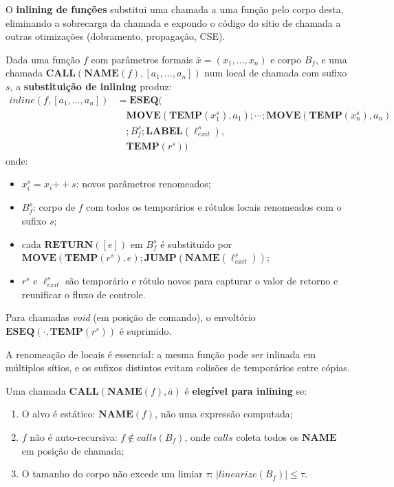 O \textbf{inlining de funções} substitui uma chamada a uma função pelo corpo
desta, eliminando a sobrecarga da chamada e expondo o código do sítio de chamada
a outras otimizações (dobramento, propagação, CSE).

\begin{Definition}\label{def:inline}
  Dada uma função $f$ com parâmetros formais $\bar{x} = (x_1, \ldots, x_n)$ e
  corpo $B_f$, e uma chamada $\mathbf{CALL}(\mathbf{NAME}(f), [a_1,\ldots,a_n])$
  num local de chamada com sufixo $s$, a \textbf{substituição de
  inlining} produz:
  \[
    \begin{aligned}
      \mathit{inline}(f, [a_1,\ldots,a_n])
      &= \mathbf{ESEQ}( \\
        &\quad \mathbf{MOVE}(\mathbf{TEMP}(x_1^s), a_1) \mathbin{;}
        \cdots \mathbin{;}
        \mathbf{MOVE}(\mathbf{TEMP}(x_n^s), a_n) \\
        &\quad \mathbin{;} B_f^s \mathbin{;}
        \mathbf{LABEL}(\ell_\mathit{exit}^s), \\
      &\quad \mathbf{TEMP}(r^s))
    \end{aligned}
  \]
  onde:
  \begin{itemize}
    \item $x_i^s = x_i \mathbin{++} s$: novos parâmetros renomeados;
    \item $B_f^s$: corpo de $f$ com todos os temporários e rótulos locais
      renomeados com o sufixo $s$;
    \item cada $\mathbf{RETURN}([e])$ em $B_f^s$ é substituído por
      $\mathbf{MOVE}(\mathbf{TEMP}(r^s), e) \mathbin{;}
      \mathbf{JUMP}(\mathbf{NAME}(\ell_\mathit{exit}^s))$;
    \item $r^s$ e $\ell_\mathit{exit}^s$ são temporário e rótulo novos para
      capturar o valor de retorno e reunificar o fluxo de controle.
  \end{itemize}
  Para chamadas \emph{void} (em posição de comando), o envoltório
  $\mathbf{ESEQ}(\cdot, \mathbf{TEMP}(r^s))$ é suprimido.
\end{Definition}

A renomeação de locais é essencial: a mesma função pode ser inlinada
em múltiplos
sítios, e os sufixos distintos evitam colisões de temporários entre cópias.

\begin{Definition}\label{def:inline-eligible}
  Uma chamada $\mathbf{CALL}(\mathbf{NAME}(f), \bar{a})$ é \textbf{elegível
  para inlining} se:
  \begin{enumerate}
    \item O alvo é estático: $\mathbf{NAME}(f)$, não uma expressão computada;
    \item $f$ não é auto-recursiva: $f \notin \mathit{calls}(B_f)$, onde
      $\mathit{calls}$ coleta todos os $\mathbf{NAME}$ em posição de chamada;
    \item O tamanho do corpo não excede um limiar $\tau$:
      $|\mathit{linearize}(B_f)| \leq \tau$.
  \end{enumerate}
\end{Definition}


